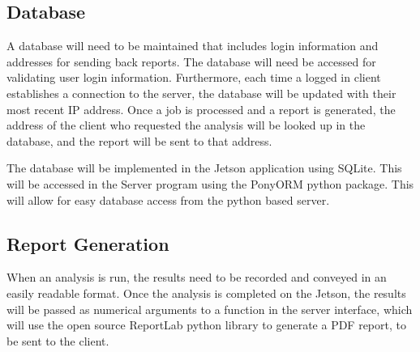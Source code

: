 \documentclass[onecolumn, draftclsnofoot,10pt, compsoc]{IEEEtran}
\begin{document}
    \subsection{Database}
    A database will need to be maintained that includes login information and addresses for sending back reports.
    The database will need be accessed for validating user login information.
    Furthermore, each time a logged in client establishes a connection to the server, the database will be updated with their most recent IP address.
    Once a job is processed and a report is generated, the address of the client who requested the analysis will be looked up in the database, and the report will be sent to that address.

    The database will be implemented in the Jetson application using SQLite.
    This will be accessed in the Server program using the PonyORM python package.
    This will allow for easy database access from the python based server.


    \subsection{Report Generation}
    When an analysis is run, the results need to be recorded and conveyed in an easily readable format.
    Once the analysis is completed on the Jetson, the results will be passed as numerical arguments to a function in the server interface, which will use the open source ReportLab python library to generate a PDF report, to be sent to the client.
    
\end{document}
